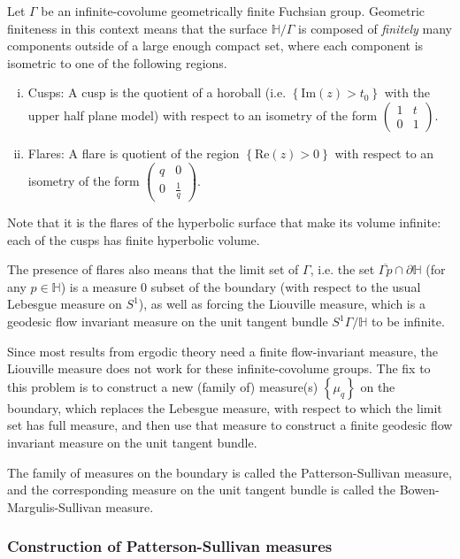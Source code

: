 Let $\Gamma$ be an infinite-covolume geometrically finite Fuchsian group.
Geometric finiteness in this context means that the surface $\mathbb{H}/\Gamma$ is composed of \emph{finitely} many components outside of a large enough compact set, where each component is isometric to one of the following regions.
\begin{enumerate}[(i)]
\item Cusps: A cusp is the quotient of a horoball (i.e. $\left\{ \mathrm{Im}(z) > t_0 \right\}$ with the upper half plane model) with respect to an isometry of the form $
  \begin{pmatrix}
    1 & t \\
    0 & 1
  \end{pmatrix}
  $.
\item Flares: A flare is quotient of the region $\left\{ \mathrm{Re}(z) > 0 \right\}$ with respect to an isometry of the form $
  \begin{pmatrix}
    q & 0 \\
    0 & \frac{1}{q}
  \end{pmatrix}
  $.
\end{enumerate}
Note that it is the flares of the hyperbolic surface that make its volume infinite: each of the cusps has finite hyperbolic volume.

The presence of flares also means that the limit set of $\Gamma$, i.e. the set $\overline{\Gamma p} \cap \partial \mathbb{H}$ (for any $p \in \mathbb{H}$) is a measure $0$ subset of the boundary (with respect to the usual Lebesgue measure on $S^1$), as well as forcing the Liouville measure, which is a geodesic flow invariant measure on the unit tangent bundle $S^1 \Gamma / \mathbb{H}$ to be infinite.

Since most results from ergodic theory need a finite flow-invariant measure, the Liouville measure does not work for these infinite-covolume groups.
The fix to this problem is to construct a new (family of) measure(s) $\left\{ \mu_q \right\}$ on the boundary, which replaces the Lebesgue measure, with respect to which the limit set has full measure, and then use that measure to construct a finite geodesic flow invariant measure on the unit tangent bundle.

The family of measures on the boundary is called the Patterson-Sullivan measure, and the corresponding measure on the unit tangent bundle is called the Bowen-Margulis-Sullivan measure.

\subsubsection{Construction of Patterson-Sullivan measures}
\label{sec:constr-patt-sull}

